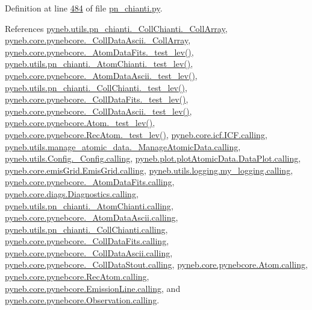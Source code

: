 Definition at line \hyperlink{pn__chianti_8py_source_l00484}{484} of file \hyperlink{pn__chianti_8py_source}{pn\-\_\-chianti.\-py}.



References \hyperlink{pn__chianti_8py_source_l00457}{pyneb.\-utils.\-pn\-\_\-chianti.\-\_\-\-Coll\-Chianti.\-\_\-\-Coll\-Array}, \hyperlink{pynebcore_8py_source_l01006}{pyneb.\-core.\-pynebcore.\-\_\-\-Coll\-Data\-Ascii.\-\_\-\-Coll\-Array}, \hyperlink{pynebcore_8py_source_l00178}{pyneb.\-core.\-pynebcore.\-\_\-\-Atom\-Data\-Fits.\-\_\-test\-\_\-lev()}, \hyperlink{pn__chianti_8py_source_l00304}{pyneb.\-utils.\-pn\-\_\-chianti.\-\_\-\-Atom\-Chianti.\-\_\-test\-\_\-lev()}, \hyperlink{pynebcore_8py_source_l00447}{pyneb.\-core.\-pynebcore.\-\_\-\-Atom\-Data\-Ascii.\-\_\-test\-\_\-lev()}, \hyperlink{pn__chianti_8py_source_l00472}{pyneb.\-utils.\-pn\-\_\-chianti.\-\_\-\-Coll\-Chianti.\-\_\-test\-\_\-lev()}, \hyperlink{pynebcore_8py_source_l00677}{pyneb.\-core.\-pynebcore.\-\_\-\-Coll\-Data\-Fits.\-\_\-test\-\_\-lev()}, \hyperlink{pynebcore_8py_source_l01045}{pyneb.\-core.\-pynebcore.\-\_\-\-Coll\-Data\-Ascii.\-\_\-test\-\_\-lev()}, \hyperlink{pynebcore_8py_source_l01525}{pyneb.\-core.\-pynebcore.\-Atom.\-\_\-test\-\_\-lev()}, \hyperlink{pynebcore_8py_source_l02672}{pyneb.\-core.\-pynebcore.\-Rec\-Atom.\-\_\-test\-\_\-lev()}, \hyperlink{icf_8py_source_l00016}{pyneb.\-core.\-icf.\-I\-C\-F.\-calling}, \hyperlink{manage__atomic__data_8py_source_l00018}{pyneb.\-utils.\-manage\-\_\-atomic\-\_\-data.\-\_\-\-Manage\-Atomic\-Data.\-calling}, \hyperlink{_config_8py_source_l00032}{pyneb.\-utils.\-Config.\-\_\-\-Config.\-calling}, \hyperlink{plot_atomic_data_8py_source_l00042}{pyneb.\-plot.\-plot\-Atomic\-Data.\-Data\-Plot.\-calling}, \hyperlink{emis_grid_8py_source_l00044}{pyneb.\-core.\-emis\-Grid.\-Emis\-Grid.\-calling}, \hyperlink{logging_8py_source_l00044}{pyneb.\-utils.\-logging.\-my\-\_\-logging.\-calling}, \hyperlink{pynebcore_8py_source_l00097}{pyneb.\-core.\-pynebcore.\-\_\-\-Atom\-Data\-Fits.\-calling}, \hyperlink{diags_8py_source_l00169}{pyneb.\-core.\-diags.\-Diagnostics.\-calling}, \hyperlink{pn__chianti_8py_source_l00240}{pyneb.\-utils.\-pn\-\_\-chianti.\-\_\-\-Atom\-Chianti.\-calling}, \hyperlink{pynebcore_8py_source_l00318}{pyneb.\-core.\-pynebcore.\-\_\-\-Atom\-Data\-Ascii.\-calling}, \hyperlink{pn__chianti_8py_source_l00434}{pyneb.\-utils.\-pn\-\_\-chianti.\-\_\-\-Coll\-Chianti.\-calling}, \hyperlink{pynebcore_8py_source_l00585}{pyneb.\-core.\-pynebcore.\-\_\-\-Coll\-Data\-Fits.\-calling}, \hyperlink{pynebcore_8py_source_l00936}{pyneb.\-core.\-pynebcore.\-\_\-\-Coll\-Data\-Ascii.\-calling}, \hyperlink{pynebcore_8py_source_l01156}{pyneb.\-core.\-pynebcore.\-\_\-\-Coll\-Data\-Stout.\-calling}, \hyperlink{pynebcore_8py_source_l01229}{pyneb.\-core.\-pynebcore.\-Atom.\-calling}, \hyperlink{pynebcore_8py_source_l02643}{pyneb.\-core.\-pynebcore.\-Rec\-Atom.\-calling}, \hyperlink{pynebcore_8py_source_l03385}{pyneb.\-core.\-pynebcore.\-Emission\-Line.\-calling}, and \hyperlink{pynebcore_8py_source_l03541}{pyneb.\-core.\-pynebcore.\-Observation.\-calling}.


